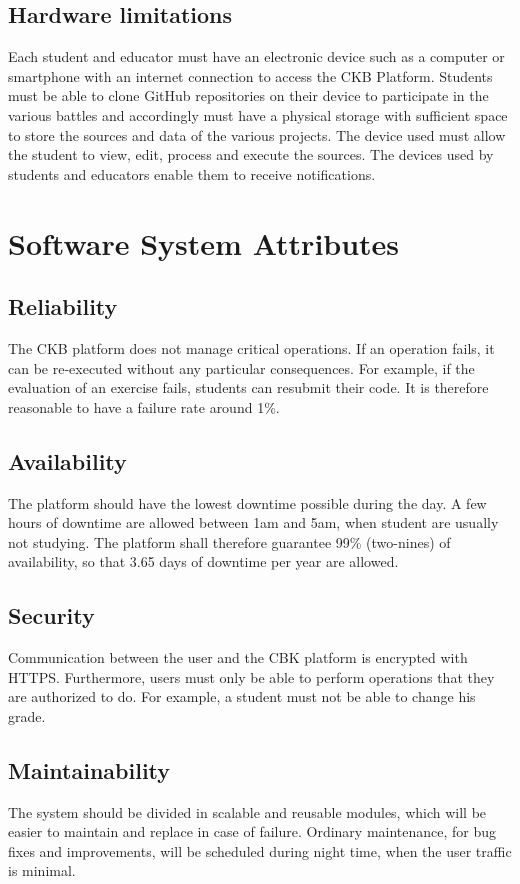 \subsection{Hardware limitations}
Each student and educator must have an electronic device such as a computer or smartphone with an internet connection to
access the CKB Platform.
Students must be able to clone GitHub repositories on their device to participate in the various battles and accordingly must have a physical storage with sufficient space to store the sources and data of the various projects.
The device used must allow the student to view, edit, process and execute the sources.
The devices used by students and educators enable them to receive notifications.

\section{Software System Attributes}
\subsection{Reliability}
The CKB platform does not manage critical operations.
If an operation fails, it can be re-executed without any particular consequences.
For example, if the evaluation of an exercise fails, students can resubmit their code.
It is therefore reasonable to have a failure rate around 1\%.

\subsection{Availability}
The platform should have the lowest downtime possible during the day.
A few hours of downtime are allowed between 1am and 5am, when student are usually not studying.
The platform shall therefore guarantee 99\% (two-nines) of availability, so that 3.65 days of downtime per year are allowed.

\subsection{Security}
Communication between the user and the CBK platform is encrypted with HTTPS. %
Furthermore, users must only be able to perform operations that they are authorized to do.
For example, a student must not be able to change his grade.

\subsection{Maintainability}
The system should be divided in scalable and reusable modules,
which will be easier to maintain and replace in case of failure.
Ordinary maintenance, for bug fixes and improvements, will be scheduled during night time, when the user traffic is minimal.

